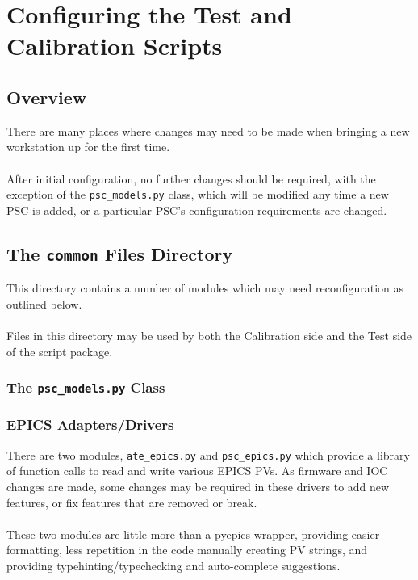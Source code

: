 
\chapter{Configuring the Test and Calibration Scripts}
\label{chap:Configuring the Test and Calibration Scripts}
\section{Overview}
There are many places where changes may need to be made when bringing a new workstation up for the first time.\\\\
After initial configuration, no further changes should be required, with the exception of the \texttt{psc\_models.py} class, which will be modified any time a new PSC is added, or a particular PSC's configuration requirements are changed.
\section{The \texttt{common} Files Directory}
This directory contains a number of modules which may need reconfiguration as outlined below.\\\\
Files in this directory may be used by both the Calibration side and the Test side of the script package. 

\newpage

\subsection{The \texttt{psc\_models.py} Class}


\newpage

\subsection{EPICS Adapters/Drivers}
There are two modules, \texttt{ate\_epics.py} and \texttt{psc\_epics.py} which provide a library of function calls to read and write various EPICS PVs. As firmware and IOC changes are made, some changes may be required in these drivers to add new features, or fix features that are removed or break.\\\\
These two modules are little more than a pyepics wrapper, providing easier formatting, less repetition in the code manually creating PV strings, and providing typehinting/typechecking and auto-complete suggestions. 

